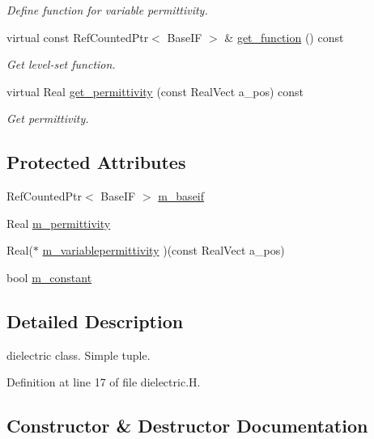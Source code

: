 \begin{DoxyCompactItemize}
\begin{DoxyCompactList}\small\item\em Define function for variable permittivity. \end{DoxyCompactList}\item 
virtual const Ref\+Counted\+Ptr$<$ Base\+IF $>$ \& \hyperlink{classdielectric_a49edb1d3d7a0efb7d9fe7d8b8f734679}{get\+\_\+function} () const 
\begin{DoxyCompactList}\small\item\em Get level-\/set function. \end{DoxyCompactList}\item 
virtual Real \hyperlink{classdielectric_aa17d4ad46482b5d5694a0da99f0e664d}{get\+\_\+permittivity} (const Real\+Vect a\+\_\+pos) const 
\begin{DoxyCompactList}\small\item\em Get permittivity. \end{DoxyCompactList}\end{DoxyCompactItemize}
\subsection*{Protected Attributes}
\begin{DoxyCompactItemize}
\item 
Ref\+Counted\+Ptr$<$ Base\+IF $>$ \hyperlink{classdielectric_ad6e1c1ec1679d5dd0d49fc0089aed731}{m\+\_\+baseif}
\item 
Real \hyperlink{classdielectric_a99db20e801c9230a3c428d4e6e646801}{m\+\_\+permittivity}
\item 
Real($\ast$ \hyperlink{classdielectric_a8ea94535dc7db4c14c844d9807ea62bc}{m\+\_\+variablepermittivity} )(const Real\+Vect a\+\_\+pos)
\item 
bool \hyperlink{classdielectric_a4cd612354ef95a10f47357320ec96fc5}{m\+\_\+constant}
\end{DoxyCompactItemize}


\subsection{Detailed Description}
dielectric class. Simple tuple. 

Definition at line 17 of file dielectric.\+H.



\subsection{Constructor \& Destructor Documentation}

